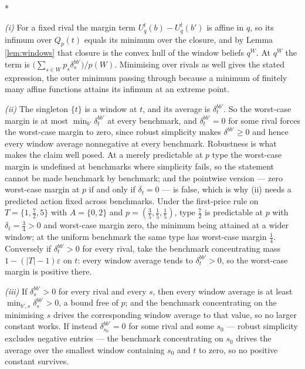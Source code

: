 \documentclass[12pt]{article}
\makeatletter
\theoremstyle{definition}
\renewenvironment{proof}[1][\proofname]{\par
  \pushQED{\qed}%
  \normalfont \topsep6\p@\@plus6\p@\relax
  \trivlist
  \item[\hskip\labelsep\itshape #1\@addpunct{.}]\mbox{}\\*
  \ignorespaces
}{%
  \popQED\endtrivlist\@endpefalse
}
\makeatother
\begin{document}
\begin{proof}[Proof of Proposition \ref{prop:margins}]
\emph{(i)} For a fixed rival the margin term $U^t_q(b) - U^t_q(b')$ is affine in $q$, so its infimum over $Q_p(t)$ equals its minimum over the closure, and by Lemma \ref{lem:windows} that closure is the convex hull of the window beliefs $q^W$. At $q^W$ the term is $\bigl(\sum_{s \in W} p_s \delta^{bb'}_s\bigr)/p(W)$. Minimising over rivals as well gives the stated expression, the outer minimum passing through because a minimum of finitely many affine functions attains its infimum at an extreme point.

\emph{(ii)} The singleton $\{t\}$ is a window at $t$, and its average is $\delta^{bb'}_t$. So the worst-case margin is at most $\min_{b'} \delta^{bb'}_t$ at every benchmark, and $\delta^{bb'}_t = 0$ for some rival forces the worst-case margin to zero, since robust simplicity makes $\delta^{bb'} \ge 0$ and hence every window average nonnegative at every benchmark. Robustness is what makes the claim well posed. At a merely predictable at $p$ type the worst-case margin is undefined at benchmarks where simplicity fails, so the statement cannot be made benchmark by benchmark; and the pointwise version --- zero worst-case margin at $p$ if and only if $\delta_t = 0$ --- is false, which is why (ii) needs a predicted action fixed across benchmarks. Under the first-price rule on $T = \{1, \tfrac72, 5\}$ with $A = \{0,2\}$ and $p = (\tfrac35, \tfrac15, \tfrac15)$, type $\tfrac72$ is predictable at $p$ with $\delta_t = \tfrac34 > 0$ and worst-case margin zero, the minimum being attained at a wider window; at the uniform benchmark the same type has worst-case margin $\tfrac14$. Conversely if $\delta^{bb'}_t > 0$ for every rival, take the benchmark concentrating mass $1 - (|T|-1)\varepsilon$ on $t$: every window average tends to $\delta^{bb'}_t > 0$, so the worst-case margin is positive there.

\emph{(iii)} If $\delta^{bb'}_s > 0$ for every rival and every $s$, then every window average is at least $\min_{b',s} \delta^{bb'}_s > 0$, a bound free of $p$; and the benchmark concentrating on the minimising $s$ drives the corresponding window average to that value, so no larger constant works. If instead $\delta^{bb'}_{s_0} = 0$ for some rival and some $s_0$ --- robust simplicity excludes negative entries --- the benchmark concentrating on $s_0$ drives the average over the smallest window containing $s_0$ and $t$ to zero, so no positive constant survives.
\end{proof}
\end{document}
